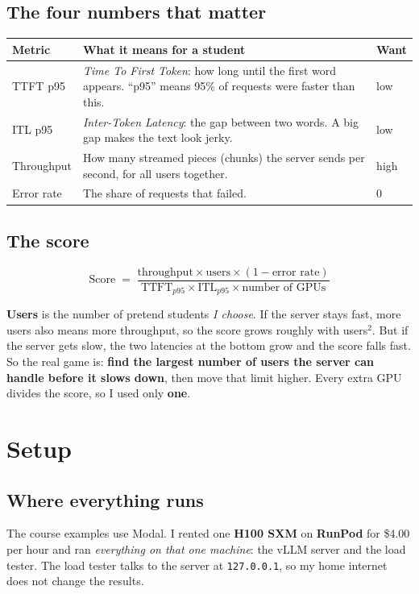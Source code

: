 \documentclass[10pt,a4paper]{article}
\begin{document}
\subsection{The four numbers that matter}
\begin{center}\small
\begin{tabularx}{\linewidth}{@{}l X l@{}}
\toprule
\textbf{Metric} & \textbf{What it means for a student} & \textbf{Want} \\
\midrule
TTFT p95 & \emph{Time To First Token}: how long until the first word appears. ``p95'' means 95\% of requests were faster than this. & low \\
ITL p95 & \emph{Inter-Token Latency}: the gap between two words. A big gap makes the text look jerky. & low \\
Throughput & How many streamed pieces (chunks) the server sends per second, for all users together. & high \\
Error rate & The share of requests that failed. & 0 \\
\bottomrule
\end{tabularx}
\end{center}

\subsection{The score}
\[
\text{Score} \;=\; \frac{\text{throughput} \times \text{users} \times (1-\text{error rate})}{\text{TTFT}_{p95} \times \text{ITL}_{p95} \times \text{number of GPUs}}
\]
\begin{note}
\textbf{Users} is the number of pretend students \emph{I choose}. If the server stays fast, more users also means more throughput, so the score grows roughly with users$^2$. But if the server gets slow, the two latencies at the bottom grow and the score falls fast. So the real game is: \textbf{find the largest number of users the server can handle before it slows down}, then move that limit higher. Every extra GPU divides the score, so I used only \textbf{one}.
\end{note}

\section{Setup}
\subsection{Where everything runs}
The course examples use Modal. I rented one \textbf{H100 SXM} on \textbf{RunPod} for \$4.00 per hour and ran \emph{everything on that one machine}: the vLLM server and the load tester. The load tester talks to the server at \texttt{127.0.0.1}, so my home internet does not change the results.
\end{document}

